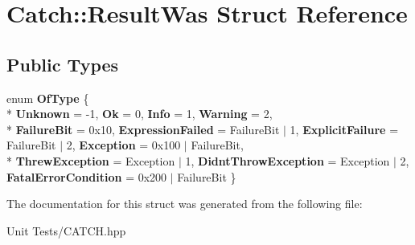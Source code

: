 \hypertarget{structCatch_1_1ResultWas}{}\section{Catch\+:\+:Result\+Was Struct Reference}
\label{structCatch_1_1ResultWas}
\subsection*{Public Types}
\begin{DoxyCompactItemize}
\item 
enum {\bfseries Of\+Type} \{ \\*
{\bfseries Unknown} = -\/1, 
{\bfseries Ok} = 0, 
{\bfseries Info} = 1, 
{\bfseries Warning} = 2, 
\\*
{\bfseries Failure\+Bit} = 0x10, 
{\bfseries Expression\+Failed} = Failure\+Bit $\vert$ 1, 
{\bfseries Explicit\+Failure} = Failure\+Bit $\vert$ 2, 
{\bfseries Exception} = 0x100 $\vert$ Failure\+Bit, 
\\*
{\bfseries Threw\+Exception} = Exception $\vert$ 1, 
{\bfseries Didnt\+Throw\+Exception} = Exception $\vert$ 2, 
{\bfseries Fatal\+Error\+Condition} = 0x200 $\vert$ Failure\+Bit
 \}\hypertarget{structCatch_1_1ResultWas_a624e1ee3661fcf6094ceef1f654601ef}{}\label{structCatch_1_1ResultWas_a624e1ee3661fcf6094ceef1f654601ef}

\end{DoxyCompactItemize}


The documentation for this struct was generated from the following file\+:\begin{DoxyCompactItemize}
\item 
Unit Tests/C\+A\+T\+C\+H.\+hpp\end{DoxyCompactItemize}
